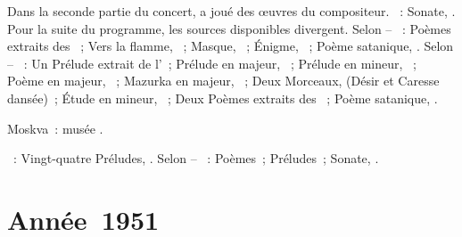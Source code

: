 \begin{description}
 Dans la seconde partie du concert, \VSofronitsky{} a joué des œuvres du
 compositeur.
 \textsc{\Scriabine{}}~: Sonate, .
 Pour la suite du programme, les sources disponibles divergent.
 Selon \NKalinenko{} -- \textsc{\Scriabine{}}~: Poèmes extraits des ~; Vers la flamme, ~; Masque, 
 ~; Énigme,  ~; Poème satanique, .
 Selon \ASofronitsky{} -- \textsc{\Scriabine{}}~: Un Prélude extrait de
 l'~; Prélude en \kG \Flat majeur,  ~; Prélude
 en \kE \Flat mineur,  ~; Poème en \kF \Sharp majeur,
  ~; Mazurka en \kF \Sharp majeur,  ~;
 Deux Morceaux,  (Désir et Caresse dansée)~; Étude en \kD \Sharp
 mineur,  ~; Deux Poèmes extraits des ~; Poème satanique, .
 \item[\DateWithWeekDay{1950-12-28}]
 Moskva~: musée \Scriabine{}.

 \textsc{\Scriabine{}}~: Vingt-quatre Préludes, .
 Selon \ASofronitsky{} -- \textsc{\Scriabine{}}~: Poèmes~; Préludes~;
 Sonate, .
\end{description}

\section{Année~1951}

